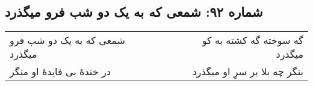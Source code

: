 \begin{center}
\section*{شماره ۹۲: شمعی که به یک دو شب فرو میگذرد}
\label{sec:092}
\begin{longtable}{l p{0.5cm} r}
شمعی که به یک دو شب فرو میگذرد
&&
گه سوخته گه کشته به کو میگذرد
\\
در خندهٔ بی فایدهٔ او منگر
&&
بنگر چه بلا بر سرِ او میگذرد
\\
\end{longtable}
\end{center}

